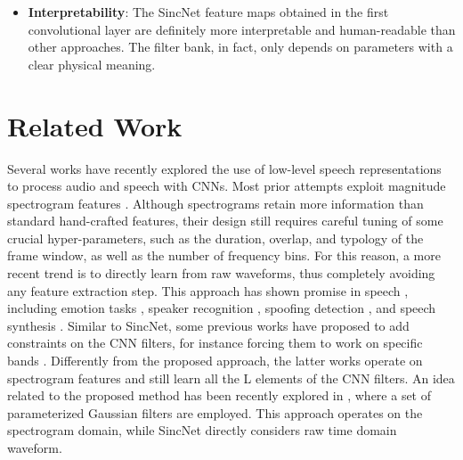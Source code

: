 \documentclass{article}
\begin{document}
\begin{itemize}

\item \textbf{Interpretability}: The SincNet feature maps obtained in the first convolutional layer are definitely more interpretable and human-readable than other approaches. The filter bank, in fact, only depends on parameters with a clear physical meaning.  
\end{itemize}

\section{Related Work} \label{sec:rel_work}
Several works have recently explored the use of low-level speech representations to process audio and speech with CNNs. Most prior attempts exploit magnitude spectrogram features \cite{e2e_spk_id,spk_rec_time_freq,voxceleb,tara_asru2013,learn_fbank_const,fbank_par}. Although spectrograms retain more information than standard hand-crafted features, their design still requires careful tuning of some crucial hyper-parameters, such as the duration, overlap, and typology of the frame window, as well as the number of frequency bins. For this reason, a more recent trend is to directly learn from raw waveforms, thus completely avoiding any feature extraction step. 
This approach has shown promise in speech \cite{palaz_raw,tara_raw,google_rawmulti,joint7,tuske}, including emotion tasks \cite{dnn_emotion}, speaker recognition \cite{raw_speaker_id}, spoofing detection \cite{spoofing_raw}, and speech synthesis \cite{wavenet,sample_rnn}.
Similar to SincNet, some previous works have proposed to add constraints on the CNN filters, for instance forcing them to work on specific bands \cite{tara_asru2013,learn_fbank_const}.  %
Differently from the proposed approach, the latter works operate on spectrogram features and still learn all the L elements of the CNN filters. An idea related to the proposed method has been recently explored in \cite{fbank_par}, where a set of parameterized Gaussian filters are employed. This approach operates on the spectrogram domain, while SincNet directly considers raw time domain waveform. 
 
\end{document}
